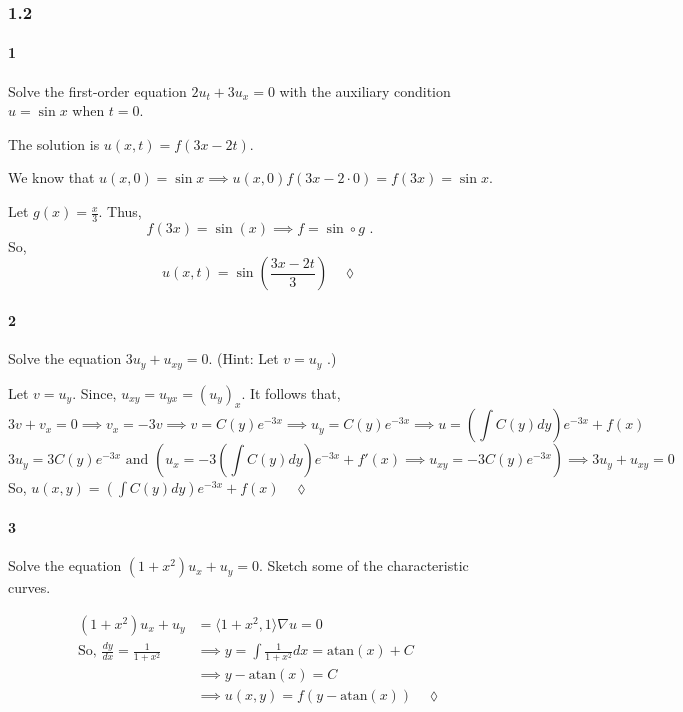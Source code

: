 \documentclass{article}
\begin{document}
\subsubsection*{1.2}

\paragraph{1} Solve the first-order equation $2u_t + 3u_x = 0$ with the auxiliary condition
$u = \sin x$ when $t = 0$.


The solution is $u(x,t) = f(3x-2t).$

We know that $u(x,0)=\sin x \implies u(x, 0)f(3x-2\cdot0) = f(3x) = \sin x$.

Let $g(x) = \frac{x}{3}$. Thus,
\[f(3x) = \sin(x)\implies f = \sin\circ g \text{ .}\]
So,
\[u(x,t) = \sin\left(\frac{3x-2t}{3}\right)\quad \lozenge\]

\paragraph{2} Solve the equation $3u_y + u_{xy} = 0$. (Hint: Let $v = u_y$ .)


Let $v = u_y.$ Since, $u_{xy} = u_{yx} = (u_y)_x.$ It follows that,
\[3v   +v_x = 0 \implies v_x = -3v \implies v = C(y)e^{-3x}
  \implies u_y = C(y)e^{-3x} \implies u = \left(\int C(y) dy
  \right)e^{-3x} + f(x)\]
\[3u_y = 3C(y)e^{-3x} \text{ and }\left(u_x = -3\left(\int C(y) dy
  \right)e^{-3x} + f'(x) \implies u_{xy} = -3C(y)e^{-3x}\right)
\implies 3u_y +u_{xy} = 0\]
So, $u(x,y) = \left(\int C(y) dy
  \right)e^{-3x} + f(x)\quad \lozenge$

\paragraph{3} Solve the equation $(1 + x^2)u_x + u_y = 0$. Sketch some
of the characteristic curves.

\begin{align*}
  (1 + x^2)u_x + u_y &= \langle 1+x^2,1 \rangle\nabla u = 0\\
  \text{So, }\frac{dy}{dx} = \frac{1}{1+x^2}&\implies y = \int
                                              \frac{1}{1+x^2} dx =
                                              \text{atan}(x) + C\\
                     &\implies y-\text{atan}(x) = C\\
  &\implies u(x,y) = f(y-\text{atan}(x))\quad \lozenge
\end{align*}
\end{document}
